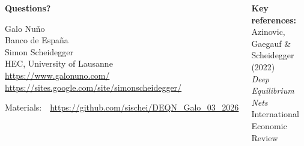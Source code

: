 \documentclass[aspectratio=169,11pt]{beamer}
\begin{document}
\begin{frame}{}
\begin{columns}[c]
\begin{center}
{\Huge \textcolor{uzhblue}{\textbf{Questions?}}}

\vspace{0.8cm}
{\large Galo Nu\~{n}o}\\[2pt]
{\small Banco de Espa\~{n}a}\\[4pt]
{\large Simon Scheidegger}\\[2pt]
{\small HEC, University of Lausanne}\\[6pt]
{\scriptsize \url{https://www.galonuno.com/}}\\[2pt]
{\scriptsize \url{https://sites.google.com/site/simonscheidegger/}}

\vspace{0.6cm}
{\small Materials:~~\url{https://github.com/sischei/DEQN_Galo_03_2026}}
\end{center}

\begin{center}
\textbf{Key references:}\\[6pt]
{\small
Azinovic, Gaegauf \& Scheidegger (2022)\\
\emph{Deep Equilibrium Nets}\\
International Economic Review
}
\end{center}
\end{columns}
\end{frame}
\end{document}
